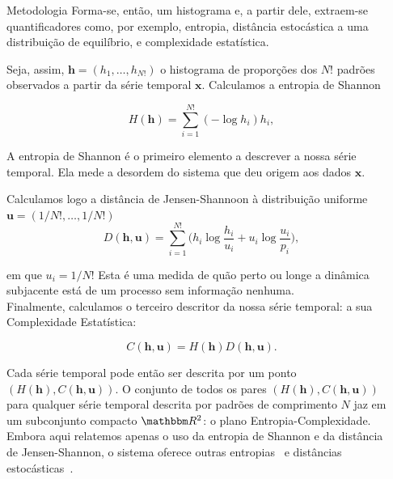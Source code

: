\documentclass[final]{beamer}
\newlength{\onecolwid}
\begin{document}
\begin{frame}[t]
\begin{columns}[t]
\begin{column}{\onecolwid}
\begin{block}{Metodologia}
Forma-se, então, um histograma e, a partir dele, extraem-se quantificadores como, por exemplo, entropia, distância estocástica a uma distribuição de equilíbrio, e complexidade estatística.\newline

Seja, assim, $\bm h=(h_1,\dots,h_{N!})$ o histograma de proporções dos $N!$ padrões observados a partir da série temporal $\bm x$.
Calculamos a entropia de Shannon

\begin{equation}
H(\bm h) = \sum_{i=1}^{N!} (-\log h_i) h_i,
\label{eq:Entropia}
\end{equation}

A entropia de Shannon é o primeiro elemento a descrever a nossa série temporal.
Ela mede a desordem do sistema que deu origem aos dados $\bm x$.\newline

Calculamos logo a distância de Jensen-Shannoon à distribuição uniforme $\bm u=(1/N!,\dots,1/N!)$
\begin{equation}
D(\bm h,\bm u) = \sum_{i=1}^{N!} \Big(h_i \log\frac{h_i}{u_i} +
u_i \log\frac{u_i}{p_i}
\Big),
\end{equation}

em que $u_i=1/N!$
Esta é uma medida de quão perto ou longe a dinâmica subjacente está de um processo sem informação nenhuma.\\

Finalmente, calculamos o terceiro descritor da nossa série temporal: a sua Complexidade Estatística:

\begin{equation}
C(\bm h, \bm u) = H(\bm h) D(\bm h, \bm u).
\end{equation}

Cada série temporal pode então ser descrita por um ponto $(H(\bm h), C(\bm h, \bm u))$.
O conjunto de todos os pares $(H(\bm h), C(\bm h, \bm u))$ para qualquer série temporal descrita por padrões de comprimento $N$ jaz em um subconjunto compacto $\mathbbm R^2$: o plano Entropia-Complexidade.\\

Embora aqui relatemos apenas o uso da entropia de Shannon e da distância de Jensen-Shannon, o sistema oferece outras entropias~\cite{salicruetal1993} e distâncias estocásticas~\cite{StatisticalInferenceBasedonDivergenceMeasures}.
\end{block} 
\end{column} 

\begin{column}{\onecolwid} 


\end{column}
\end{columns}
\end{frame}
\end{document}
